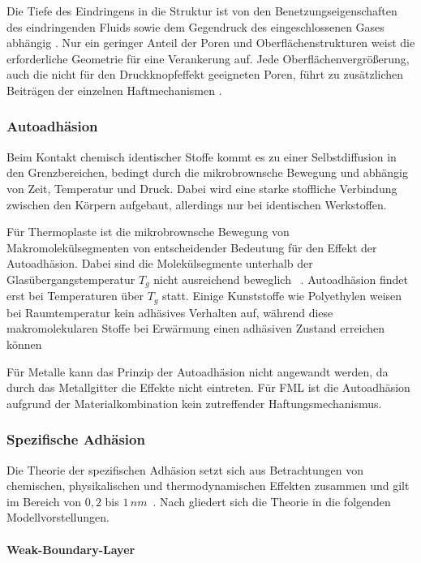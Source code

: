 Die Tiefe des Eindringens in die Struktur ist von den Benetzungseigenschaften des eindringenden Fluids sowie dem Gegendruck des eingeschlossenen Gases abhängig \cite{Mittal.1999}.
Nur ein geringer Anteil der Poren und Oberflächenstrukturen weist die erforderliche Geometrie für eine Verankerung auf.
Jede Oberflächenvergrößerung, auch die nicht für den Druckknopfeffekt geeigneten Poren, führt zu zusätzlichen Beiträgen der einzelnen Haftmechanismen \cite{Flock.b}.

\subsubsection{Autoadhäsion}\label{sec:autoadhäsion}

Beim Kontakt chemisch identischer Stoffe kommt es zu einer Selbstdiffusion in den Grenzbereichen, bedingt durch die mikrobrownsche Bewegung und abhängig von Zeit, Temperatur und Druck.
Dabei wird eine starke stoffliche Verbindung zwischen den Körpern aufgebaut, allerdings nur bei identischen Werkstoffen.

Für Thermoplaste ist die mikrobrownsche Bewegung von Makromolekülsegmenten von entscheidender Bedeutung für den Effekt der Autoadhäsion.
Dabei sind die Molekülsegmente unterhalb der Glasübergangstemperatur $T_g$ nicht ausreichend beweglich \cite{SEIDLER.1971}~.
Autoadhäsion findet erst bei Temperaturen über $T_g$ statt.
Einige Kunststoffe wie Polyethylen weisen bei Raumtemperatur kein adhäsives Verhalten auf, während diese makromolekularen Stoffe bei Erwärmung einen adhäsiven Zustand erreichen können \cite{SEIDLER.1971}

Für Metalle kann das Prinzip der Autoadhäsion nicht angewandt werden, da durch das Metallgitter die Effekte nicht eintreten.
Für FML ist die Autoadhäsion aufgrund der Materialkombination kein zutreffender Haftungsmechanismus. \cite{Flock.b}

\subsubsection{Spezifische Adhäsion} \label{sec:spez}

Die Theorie der spezifischen Adhäsion setzt sich aus Betrachtungen von chemischen, physikalischen und thermodynamischen Effekten zusammen und gilt im Bereich von $0,2$ bis $1\,nm$~.
Nach \cite{Garbassi.1998} gliedert sich die Theorie in die folgenden Modellvorstellungen.

\paragraph{Weak-Boundary-Layer}

